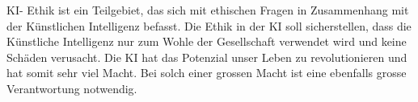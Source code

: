 \documentclass{report}
\begin{document}
KI- Ethik ist ein Teilgebiet, das sich mit ethischen Fragen in Zusammenhang mit der Künstlichen Intelligenz befasst. Die Ethik in der KI soll sicherstellen, dass die Künstliche Intelligenz nur zum Wohle der Gesellschaft verwendet wird und keine Schäden verusacht. Die KI hat das Potenzial unser Leben zu revolutionieren und hat somit sehr viel Macht. Bei solch einer grossen Macht ist eine ebenfalls grosse Verantwortung notwendig.











\printbibliography
\end{document}
